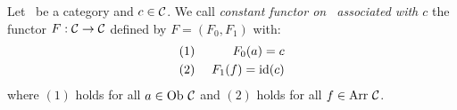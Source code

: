 \begin{defin}\label{Fun:def:constant}
    Let \Cat\ be a category and $c\in\mbox{$\cal C$}$. We call {\em constant functor on 
    \Cat\ associated with $c$} the functor $F:\mbox{$\cal C$}\to\mbox{$\cal C$}$ defined by 
    $F=(F_{0},F_{1})$ with:
        \begin{eqnarray*}
            (1)&\ &F_{0}(a) = c\\
            (2)&\ &F_{1}(f) = \mbox{\rm id}(c)
        \end{eqnarray*}
    where $(1)$ holds for all $a\in\mbox{\rm Ob}\ \mbox{$\cal C$}$ and $(2)$ holds for all
    $f\in\mbox{\rm Arr}\ \mbox{$\cal C$}$.
\end{defin}


